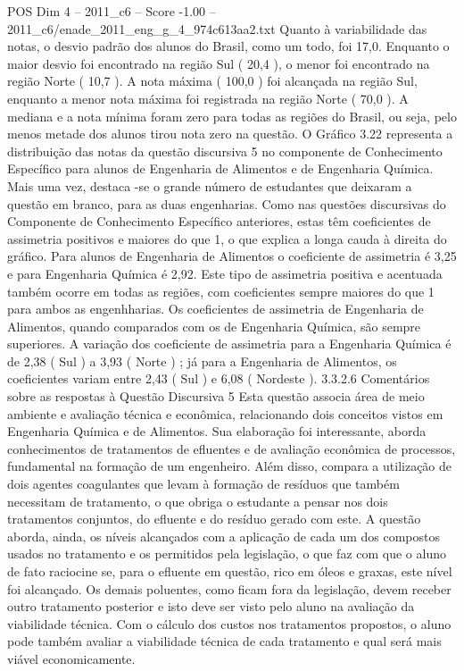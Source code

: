 \begin{textsample}{POS Dim 4 – 2011\_c6 – Score -1.00 – 2011\_c6/enade\_2011\_eng\_g\_4\_974c613aa2.txt}
Quanto à variabilidade das notas, o desvio padrão dos alunos do Brasil, como um todo, foi 17,0.
Enquanto o maior desvio foi encontrado na região Sul ( 20,4 ), o menor foi encontrado na região Norte ( 10,7 ).
A nota máxima ( 100,0 ) foi alcançada na região Sul, enquanto a menor nota máxima foi registrada na região Norte ( 70,0 ).
A mediana e a nota mínima foram zero para todas as regiões do Brasil, ou seja, pelo menos metade dos alunos tirou nota zero na questão.
O Gráfico 3.22 representa a distribuição das notas da questão discursiva 5 no componente de Conhecimento Específico para alunos de Engenharia de Alimentos e de Engenharia Química.
Mais uma vez, destaca -se o grande número de estudantes que deixaram a questão em branco, para as duas engenharias.
Como nas questões discursivas do Componente de Conhecimento Específico anteriores, estas têm coeficientes de assimetria positivos e maiores do que 1, o que explica a longa cauda à direita do gráfico.
Para alunos de Engenharia de Alimentos o coeficiente de assimetria é 3,25 e para Engenharia Química é 2,92.
Este tipo de assimetria positiva e acentuada também ocorre em todas as regiões, com coeficientes sempre maiores do que 1 para ambos as engenhharias.
Os coeficientes de assimetria de Engenharia de Alimentos, quando comparados com os de Engenharia Química, são sempre superiores.
A variação dos coeficiente de assimetria para a Engenharia Química é de 2,38 ( Sul ) a 3,93 ( Norte ) ; já para a Engenharia de Alimentos, os coeficientes variam entre 2,43 ( Sul ) e 6,08 ( Nordeste ). 3.3.2.6 Comentários sobre as respostas à Questão Discursiva 5 Esta questão associa área de meio ambiente e avaliação técnica e econômica, relacionando dois conceitos vistos em Engenharia Química e de Alimentos.
Sua elaboração foi interessante, aborda conhecimentos de tratamentos de efluentes e de avaliação econômica de processos, fundamental na formação de um engenheiro.
Além disso, compara a utilização de dois agentes coagulantes que levam à formação de resíduos que também necessitam de tratamento, o que obriga o estudante a pensar nos dois tratamentos conjuntos, do efluente e do resíduo gerado com este.
A questão aborda, ainda, os níveis alcançados com a aplicação de cada um dos compostos usados no tratamento e os permitidos pela legislação, o que faz com que o aluno de fato raciocine se, para o efluente em questão, rico em óleos e graxas, este nível foi alcançado.
Os demais poluentes, como ficam fora da legislação, devem receber outro tratamento posterior e isto deve ser visto pelo aluno na avaliação da viabilidade técnica.
Com o cálculo dos custos nos tratamentos propostos, o aluno pode também avaliar a viabilidade técnica de cada tratamento e qual será mais viável economicamente.

\end{textsample}
